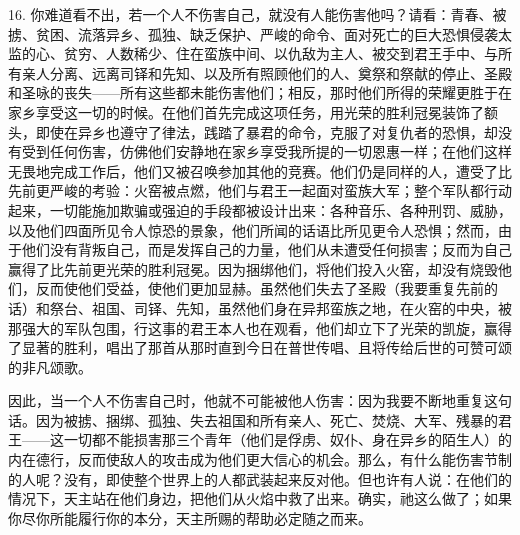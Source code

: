 16. 你难道看不出，若一个人不伤害自己，就没有人能伤害他吗？请看：青春、被掳、贫困、流落异乡、孤独、缺乏保护、严峻的命令、面对死亡的巨大恐惧侵袭太监的心、贫穷、人数稀少、住在蛮族中间、以仇敌为主人、被交到君王手中、与所有亲人分离、远离司铎和先知、以及所有照顾他们的人、奠祭和祭献的停止、圣殿和圣咏的丧失——所有这些都未能伤害他们；相反，那时他们所得的荣耀更胜于在家乡享受这一切的时候。在他们首先完成这项任务，用光荣的胜利冠冕装饰了额头，即使在异乡也遵守了律法，践踏了暴君的命令，克服了对复仇者的恐惧，却没有受到任何伤害，仿佛他们安静地在家乡享受我所提的一切恩惠一样；在他们这样无畏地完成工作后，他们又被召唤参加其他的竞赛。他们仍是同样的人，遭受了比先前更严峻的考验：火窑被点燃，他们与君王一起面对蛮族大军；整个军队都行动起来，一切能施加欺骗或强迫的手段都被设计出来：各种音乐、各种刑罚、威胁，以及他们四面所见令人惊恐的景象，他们所闻的话语比所见更令人恐惧；然而，由于他们没有背叛自己，而是发挥自己的力量，他们从未遭受任何损害；反而为自己赢得了比先前更光荣的胜利冠冕。因为捆绑他们，将他们投入火窑，却没有烧毁他们，反而使他们受益，使他们更加显赫。虽然他们失去了圣殿（我要重复先前的话）和祭台、祖国、司铎、先知，虽然他们身在异邦蛮族之地，在火窑的中央，被那强大的军队包围，行这事的君王本人也在观看，他们却立下了光荣的凯旋，赢得了显著的胜利，唱出了那首从那时直到今日在普世传唱、且将传给后世的可赞可颂的非凡颂歌。\par

因此，当一个人不伤害自己时，他就不可能被他人伤害：因为我要不断地重复这句话。因为被掳、捆绑、孤独、失去祖国和所有亲人、死亡、焚烧、大军、残暴的君王——这一切都不能损害那三个青年（他们是俘虏、奴仆、身在异乡的陌生人）的内在德行，反而使敌人的攻击成为他们更大信心的机会。那么，有什么能伤害节制的人呢？没有，即使整个世界上的人都武装起来反对他。但也许有人说：在他们的情况下，天主站在他们身边，把他们从火焰中救了出来。确实，祂这么做了；如果你尽你所能履行你的本分，天主所赐的帮助必定随之而来。\par

